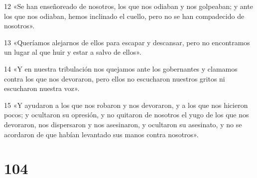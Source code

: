 \par 12 «Se han enseñoreado de nosotros, los que nos odiaban y nos golpeaban; y ante los que nos odiaban, hemos inclinado el cuello, pero no se han compadecido de nosotros».
\par 13 «Queríamos alejarnos de ellos para escapar y descansar, pero no encontramos un lugar al que huir y estar a salvo de ellos».
\par 14 «Y en nuestra tribulación nos quejamos ante los gobernantes y clamamos contra los que nos devoraron, pero ellos no escucharon nuestros gritos ni escucharon nuestra voz».
\par 15 «Y ayudaron a los que nos robaron y nos devoraron, y a los que nos hicieron pocos; y ocultaron su opresión, y no quitaron de nosotros el yugo de los que nos devoraron, nos dispersaron y nos asesinaron, y ocultaron su asesinato, y no se acordaron de que habían levantado sus manos contra nosotros».

\chapter{104}

